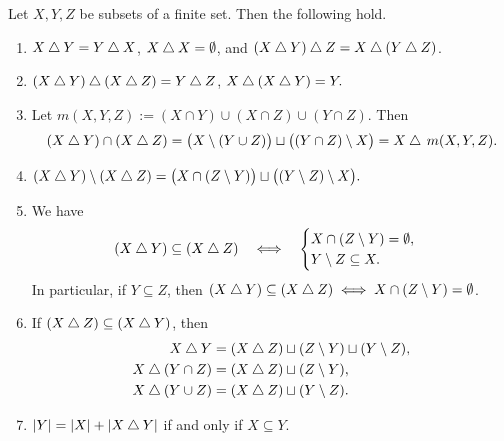 \documentclass[a4paper,leqno]{amsart}
\begin{document}
\begin{lem}\label{lem:symmetric-difference-identities}
Let $X,Y,Z$ be subsets of a finite set. Then the following hold.
\begin{enumerate}[label=\textup{(\arabic*)},ref=\arabic*]

\item\label{itm:symdiff-associativity} $X\mathbin{\triangle} Y=Y\mathbin{\triangle} X$, $X\mathbin{\triangle} X=\emptyset$, and $(X\mathbin{\triangle} Y)\mathbin{\triangle} Z=X\mathbin{\triangle}(Y\mathbin{\triangle} Z)$.

\item\label{itm:symdiff-cancellation} $(X\mathbin{\triangle} Y)\mathbin{\triangle}(X\mathbin{\triangle} Z)=Y\mathbin{\triangle} Z$, $X\mathbin{\triangle}(X\mathbin{\triangle} Y)=Y.$

\item\label{itm:symdiff-intersection} Let $m(X,Y,Z):=(X\cap Y)\cup (X\cap Z)\cup (Y\cap Z)$.
Then $$(X\mathbin{\triangle} Y)\cap (X\mathbin{\triangle} Z) = \bigl(X\setminus(Y\cup Z)\bigr)\sqcup\bigl((Y\cap Z)\setminus X\bigr) = X\mathbin{\triangle}\, m(X,Y,Z).$$

\item\label{itm:symdiff-difference} $ (X\mathbin{\triangle} Y)\setminus(X\mathbin{\triangle} Z) =\bigl(X\cap(Z\setminus Y)\bigr) \sqcup\bigl((Y\setminus Z)\setminus X\bigr).$

\item\label{itm:symdiff-inclusion} We have 
\[
(X\mathbin{\triangle} Y)\subseteq(X\mathbin{\triangle} Z)\quad \Longleftrightarrow\quad 
 \begin{cases}
     X\cap(Z\setminus Y)=\emptyset,\\
     Y\setminus Z\subseteq X.
 \end{cases}
\]
In particular, if $Y\subseteq Z$, then $ (X\mathbin{\triangle} Y)\subseteq(X\mathbin{\triangle} Z) \;\Longleftrightarrow\; X\cap(Z\setminus Y)=\emptyset$.

\item\label{itm:symdiff-interval} If $(X\mathbin{\triangle} Z)\subseteq(X\mathbin{\triangle} Y)$, then
\[
\begin{aligned}
 X\mathbin{\triangle} Y&=(X\mathbin{\triangle} Z)\sqcup(Z\setminus Y)\sqcup(Y\setminus Z),\\
 X\mathbin{\triangle}(Y\cap Z)&=(X\mathbin{\triangle} Z)\sqcup(Z\setminus Y),\\
 X\mathbin{\triangle}(Y\cup Z)&=(X\mathbin{\triangle} Z)\sqcup(Y\setminus Z).
\end{aligned}
\]

\item\label{itm:symdiff-cardinality} $|Y|=|X|+|X\mathbin{\triangle} Y|$ if and only if  $X\subseteq Y$.
\end{enumerate}

\end{lem}
\end{document}
